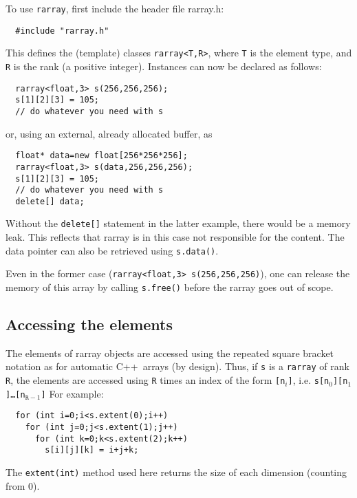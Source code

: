 \documentclass[12pt,twoside]{article}
\newcommand{\cxx}{C{++}}
\begin{document}
To use \texttt{rarray}, first include the header file rarray.h:
\begin{framed}\vspace{-14pt}%
\begin{verbatim}
  #include "rarray.h"
\end{verbatim}%
\vspace{-14pt}
\end{framed}
This defines the (template) classes \texttt{rarray{\tt<}T,R{\tt>}}, where
\texttt T is the element type, and \texttt R is the
rank (a positive integer).  Instances can now be
declared as follows:
\begin{framed}\vspace{-18pt}%
\begin{verbatim}
  rarray<float,3> s(256,256,256);
  s[1][2][3] = 105;
  // do whatever you need with s
\end{verbatim}%
\vspace{-14pt}
\end{framed}
or, using an external, already allocated buffer, as
\begin{framed}\vspace{-18pt}%
\begin{verbatim}
  float* data=new float[256*256*256];  
  rarray<float,3> s(data,256,256,256);
  s[1][2][3] = 105;
  // do whatever you need with s
  delete[] data;
\end{verbatim}%
\vspace{-14pt}
\end{framed}
Without the \texttt{delete[]} statement in the latter example, there would be a memory leak. This reflects that rarray is in this case not responsible
for the content. The data pointer can also be retrieved using
\texttt{s.data()}. 

Even in the former case (\texttt{rarray<float,3> s(256,256,256)}), one can release the memory of this array by calling \texttt{s.free()} before the rarray goes out of scope.

\subsection{Accessing the elements}

The elements of rarray objects are accessed using the repeated square
bracket notation as for automatic \cxx\ arrays (by design). Thus, if \texttt{s} is a \texttt{rarray} of rank \texttt R, the elements are accessed using \texttt{R} times an index of the form \texttt{[n$_i$]}, i.e. \texttt{s[n$_0$][n$_1$]\dots[n$_{\texttt{R}-1}$]}
For example:\vspace{-9pt}
\begin{framed}\vspace{-18pt}%
\begin{verbatim}
  for (int i=0;i<s.extent(0);i++)
    for (int j=0;j<s.extent(1);j++)
      for (int k=0;k<s.extent(2);k++)
        s[i][j][k] = i+j+k;
\end{verbatim}%
\vspace{-12pt}
\end{framed}\vspace{-8pt}\noindent
The \texttt{extent(int)} method used here returns the size of each dimension (counting from 0).
\end{document}
